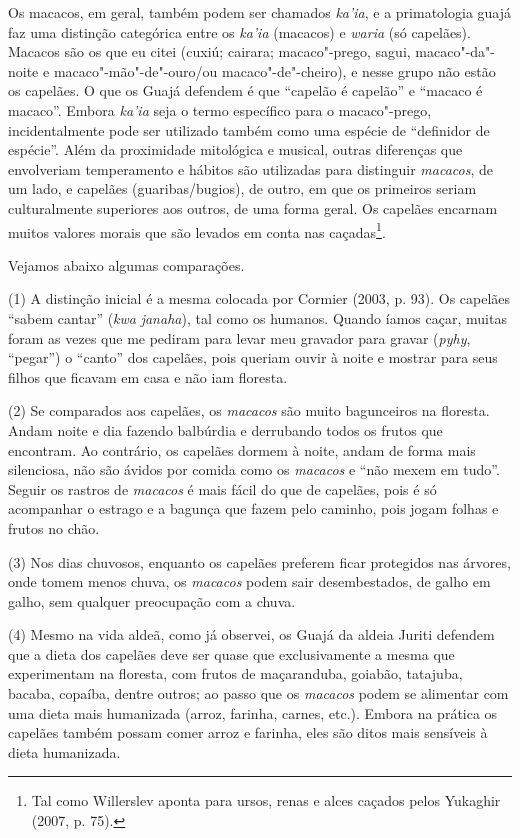 Os macacos, em geral, também podem ser chamados \emph{ka'ia}, e a
primatologia guajá faz uma distinção categórica entre os \emph{ka'ia}
(macacos) e \emph{waria} (só capelães). Macacos são os que eu citei
(cuxiú; cairara; macaco"-prego, sagui, macaco"-da"-noite e
macaco"-mão"-de"-ouro/ou macaco"-de"-cheiro), e nesse grupo não estão os
capelães. O que os Guajá defendem é que ``capelão é capelão'' e ``macaco
é macaco''. Embora \emph{ka'ia} seja o termo específico para o
macaco"-prego, incidentalmente pode ser utilizado também como uma espécie
de ``definidor de espécie''. Além da proximidade mitológica e musical,
outras diferenças que envolveriam temperamento e hábitos são utilizadas
para distinguir \emph{macacos}, de um lado, e capelães
(guaribas/bugios), de outro, em que os primeiros seriam culturalmente
superiores aos outros, de uma forma geral. Os capelães encarnam muitos
valores morais que são levados em conta nas caçadas\footnote{Tal como
  Willerslev aponta para ursos, renas e alces caçados pelos Yukaghir
  (2007, p. 75).}.

Vejamos abaixo algumas comparações.

(1) A distinção inicial é a mesma colocada por Cormier (2003, p. 93). Os
capelães ``sabem cantar'' (\emph{kwa} \emph{janaha}), tal como os humanos.
Quando íamos caçar, muitas foram as vezes que me pediram para levar meu
gravador para gravar (\emph{pyhy}, ``pegar'') o ``canto'' dos capelães, pois
queriam ouvir à noite e mostrar para seus filhos que ficavam em casa e
não iam floresta.

(2) Se comparados aos capelães, os \emph{macacos} são muito bagunceiros
na floresta. Andam noite e dia fazendo balbúrdia e derrubando todos os
frutos que encontram. Ao contrário, os capelães dormem à noite, andam de
forma mais silenciosa, não são ávidos por comida como os \emph{macacos}
e ``não mexem em tudo''. Seguir os rastros de \emph{macacos} é mais fácil
do que de capelães, pois é só acompanhar o estrago e a bagunça que fazem
pelo caminho, pois jogam folhas e frutos no chão.

(3) Nos dias chuvosos, enquanto os capelães preferem ficar protegidos
nas árvores, onde tomem menos chuva, os \emph{macacos} podem sair
desembestados, de galho em galho, sem qualquer preocupação com a chuva.

(4) Mesmo na vida aldeã, como já observei, os Guajá da aldeia Juriti
defendem que a dieta dos capelães deve ser quase que exclusivamente a
mesma que experimentam na floresta, com frutos de maçaranduba, goiabão,
tatajuba, bacaba, copaíba, dentre outros; ao passo que os \emph{macacos}
podem se alimentar com uma dieta mais humanizada (arroz, farinha,
carnes, etc.). Embora na prática os capelães também possam comer arroz e
farinha, eles são ditos mais sensíveis à dieta humanizada.

